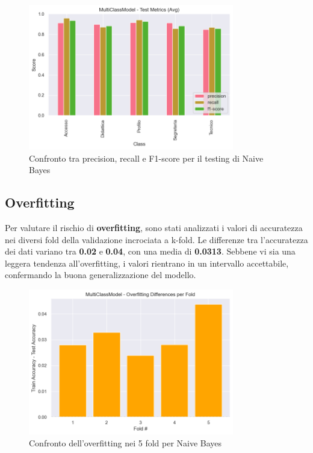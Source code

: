 \begin{figure}[H]
    \centering
    \includegraphics[width=0.8\textwidth]{images/metrics_test_naive_bayes.png}
    \caption{Confronto tra precision, recall e F1-score per il testing di Naive Bayes}
    \label{fig:metrics_train_naive_bayes}
\end{figure}

\subsection{Overfitting}

Per valutare il rischio di \textbf{overfitting}, sono stati analizzati i valori di accuratezza nei diversi fold della validazione incrociata a k-fold. Le differenze tra l'accuratezza dei dati variano tra \textbf{0.02} e \textbf{0.04}, con una media di \textbf{0.0313}. Sebbene vi sia una leggera tendenza all'overfitting, i valori rientrano in un intervallo accettabile, confermando la buona generalizzazione del modello.

\begin{figure}[H]
    \centering
    \includegraphics[width=0.8\textwidth]{images/overfitting_naive_bayes.png}
    \caption{Confronto dell'overfitting nei 5 fold per Naive Bayes}
    \label{fig:overfitting_naive_bayes}
\end{figure}

